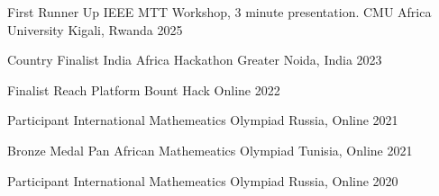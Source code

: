 



\begin{cvhonors}

  \cvhonor
    {First Runner Up} %
    {IEEE MTT Workshop, 3 minute presentation. CMU Africa University} %
    {Kigali, Rwanda} %
    {2025} %

  \cvhonor
    {Country Finalist} %
    {India Africa Hackathon} %
    {Greater Noida, India} %
    {2023} %

  \cvhonor
    {Finalist} %
    {Reach Platform Bount Hack} %
    {Online} %
    {2022} %

  \cvhonor
    {Participant} %
    {International Mathemeatics Olympiad} %
    {Russia, Online} %
    {2021} %

  \cvhonor
    {Bronze Medal} %
    {Pan African Mathemeatics Olympiad} %
    {Tunisia, Online} %
    {2021} %

  \cvhonor
    {Participant} %
    {International Mathemeatics Olympiad} %
    {Russia, Online} %
    {2020} %

\end{cvhonors}




